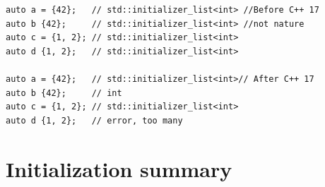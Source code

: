 \documentclass[a4paper,11pt,twoside]{book}
\begin{document}
\begin{enumerate}
\begin{lstlisting}[numbers=none]
auto a = {42};   // std::initializer_list<int> //Before C++ 17
auto b {42};     // std::initializer_list<int> //not nature
auto c = {1, 2}; // std::initializer_list<int>
auto d {1, 2};   // std::initializer_list<int>

auto a = {42};   // std::initializer_list<int>// After C++ 17
auto b {42};     // int
auto c = {1, 2}; // std::initializer_list<int>
auto d {1, 2};   // error, too many 
\end{lstlisting}

\end{enumerate}


\section{Initialization summary}
\end{document}
